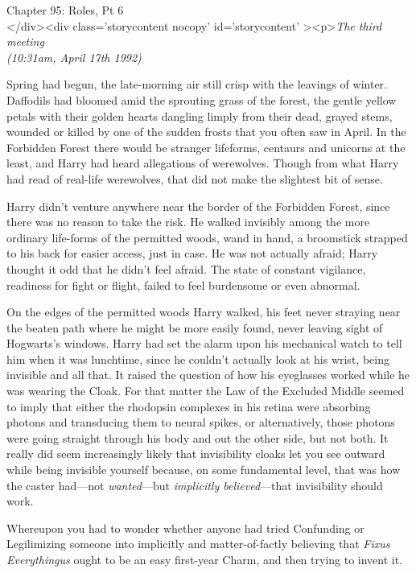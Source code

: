 
Chapter 95: Roles, Pt 6\\
</div><div  class='storycontent nocopy' id='storycontent' ><p>\emph{The third meeting\\
(10:31am, April 17th 1992)}

Spring had begun, the late-morning air still crisp with the leavings of winter. Daffodils had bloomed amid the sprouting grass of the forest, the gentle yellow petals with their golden hearts dangling limply from their dead, grayed stems, wounded or killed by one of the sudden frosts that you often saw in April. In the Forbidden Forest there would be stranger lifeforms, centaurs and unicorns at the least, and Harry had heard allegations of werewolves. Though from what Harry had read of real-life werewolves, that did not make the slightest bit of sense.

Harry didn't venture anywhere near the border of the Forbidden Forest, since there was no reason to take the risk. He walked invisibly among the more ordinary life-forms of the permitted woods, wand in hand, a broomstick strapped to his back for easier access, just in case. He was not actually afraid; Harry thought it odd that he didn't feel afraid. The state of constant vigilance, readiness for fight or flight, failed to feel burdensome or even abnormal.

On the edges of the permitted woods Harry walked, his feet never straying near the beaten path where he might be more easily found, never leaving sight of Hogwarts's windows. Harry had set the alarm upon his mechanical watch to tell him when it was lunchtime, since he couldn't actually look at his wrist, being invisible and all that. It raised the question of how his eyeglasses worked while he was wearing the Cloak. For that matter the Law of the Excluded Middle seemed to imply that either the rhodopsin complexes in his retina were absorbing photons and transducing them to neural spikes, or alternatively, those photons were going straight through his body and out the other side, but not both. It really did seem increasingly likely that invisibility cloaks let you see outward while being invisible yourself because, on some fundamental level, that was how the caster had---not \emph{wanted}---but \emph{implicitly believed}---that invisibility should work.

Whereupon you had to wonder whether anyone had tried Confunding or Legilimizing someone into implicitly and matter-of-factly believing that \emph{Fixus Everythingus} ought to be an easy first-year Charm, and then trying to invent it.

